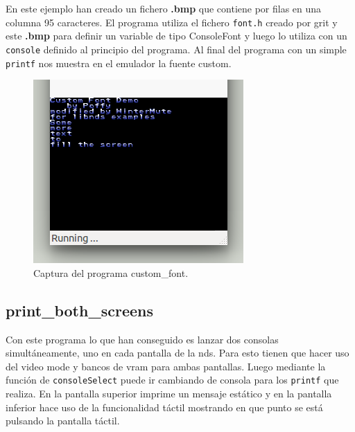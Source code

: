 \documentclass[12pt,english]{article}
\begin{document}
    En este ejemplo han creado un fichero \textbf{.bmp} que contiene por filas en una columna 95 caracteres. El programa utiliza el fichero \texttt{font.h} creado por grit y este \textbf{.bmp} para definir un variable de tipo ConsoleFont y luego lo utiliza con un \texttt{console} definido al principio del programa. Al final del programa con un simple \texttt{printf} nos muestra en el emulador la fuente custom.

    \begin{figure}[H] 
    \centering
    \includegraphics[scale=0.5]{p3Media/custom_font}
    \caption{Captura del programa custom\_font.}
    \end{figure}

    \newpage

    \subsection{print\_both\_screens}

    Con este programa lo que han conseguido es lanzar dos consolas simultáneamente, uno en cada pantalla de la nds. Para esto tienen que hacer uso del video mode y bancos de vram para ambas pantallas. Luego mediante la función de \texttt{consoleSelect} puede ir cambiando de consola para los \texttt{printf} que realiza. En la pantalla superior imprime un mensaje estático y en la pantalla inferior hace uso de la funcionalidad táctil mostrando en que punto se está pulsando la pantalla táctil.
\end{document}
